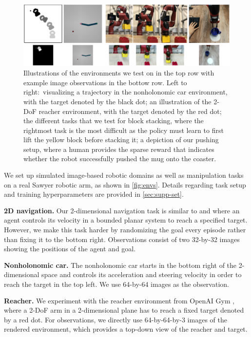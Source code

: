 \begin{figure}
    \centering
    \includegraphics[width=\linewidth]{img/solar/domains.png}
    \caption{Illustrations of the environments we test on in the top row with example image observations in the bottow row. Left to right:~visualizing a trajectory in the nonholonomic car environment, with the target denoted by the black dot; an illustration of the 2-DoF reacher environment, with the target denoted by the red dot; the different tasks that we test for block stacking, where the rightmost task is the most difficult as the policy must learn to first lift the yellow block before stacking it; a depiction of our pushing setup, where a human provides the sparse reward that indicates whether the robot successfully pushed the mug onto the coaster.}
    \label{fig:envs}
    \vspace{-.5em}
\end{figure}

We set up simulated image-based robotic domains as well as manipulation tasks on a real Sawyer robotic arm, as shown in \autoref{fig:envs}. Details regarding task setup and training hyperparameters are provided in \autoref{sec:supp-set}.

{\bf 2D navigation.} Our 2-dimensional navigation task is similar to \citet{e2c} and \citet{rce} where an agent controls its velocity in a bounded planar system to reach a specified target. However, we make this task harder by randomizing the goal every episode rather than fixing it to the bottom right. Observations consist of two \mbox{32-by-32} images showing the positions of the agent and goal.

{\bf Nonholonomic car.} The nonholonomic car starts in the bottom right of the 2-dimensional space and controls its acceleration and steering velocity in order to reach the target in the top left. We use \mbox{64-by-64} images as the observation.

{\bf Reacher.} We experiment with the reacher environment from OpenAI Gym \citep{gym}, where a 2-DoF arm in a 2-dimensional plane has to reach a fixed target denoted by a red dot. For observations, we directly use \mbox{64-by-64-by-3} images of the rendered environment, which provides a top-down view of the reacher and target.

